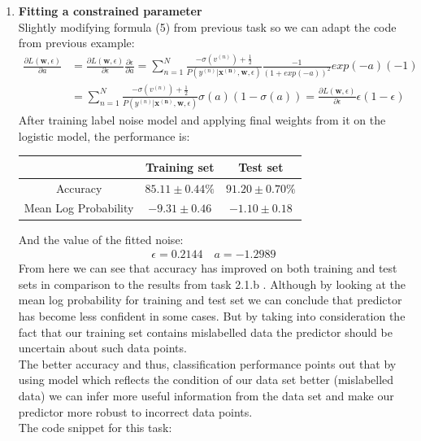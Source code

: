 \documentclass{article}
\newcommand{\vect}[1]{\boldsymbol{#1}} %
\begin{document}
\begin{enumerate}[label=(\alph*)]
					\item
						\textbf{Fitting a constrained parameter}\\
						Slightly modifying formula (5) from previous task so we can adapt the code from previous example:
						\begin{align*}
						\frac{\partial L(\vect{w}, \epsilon)}{\partial a} &=
						\frac{\partial L(\vect{w}, \epsilon)}{\partial \epsilon} 
						\frac{\partial \epsilon}{\partial a} =
						\sum_{n=1}^{N} 
							\frac 
								{-\sigma(v^{(n)}) + \frac{1}{2}} 
								{P(y^{(n)}|\vect{x^{(n)}}, \vect{w}, \epsilon)}		
							\frac{-1} {(1 + exp(-a))^2} exp(-a) (-1) 
						\\
						&=\sum_{n=1}^{N} 
								\frac 
									{-\sigma(v^{(n)}) + \frac{1}{2}} 
									{P(y^{(n)}|\vect{x^{(n)}}, \vect{w}, \epsilon)}		
							\sigma(a)(1 - \sigma(a))		=
							\frac{\partial L(\vect{w}, \epsilon)}{\partial \epsilon} 
							\epsilon (1 - \epsilon)				
						\end{align*}
						After training label noise model and applying final weights from it on the logistic model, the  performance is:
						\begin{center}
							\begin{tabular}{| c | c | c |}
								\hline
								\, & Training set & Test set \\
								\hline
								Accuracy & $85.11 \pm 0.44\%$ & $91.20 \pm 0.70\%$ \\
								\hline
								Mean Log Probability & $-9.31 \pm 0.46$ & $-1.10 \pm 0.18$\\
								\hline
							\end{tabular}
						\end{center}
						And the value of the fitted noise:
						\begin{align*}
							\epsilon =  0.2144 \quad a = -1.2989
						\end{align*}
						 From here we can see that accuracy has improved on both training and test sets in comparison to the results from task 2.1.b . Although by looking at the mean log probability for training and test set we can conclude that predictor has become less confident in some cases. But by taking into consideration the fact that our training set contains mislabelled data the predictor should be uncertain about such data points.\\ The better accuracy and thus, classification performance points out that by using model which reflects the condition of  our data set better (mislabelled data) we can infer more useful information from the data set and make our predictor more robust to incorrect data points.\\
						 The code snippet for this task:
						 
				\end{enumerate}
				
				
\end{document}
